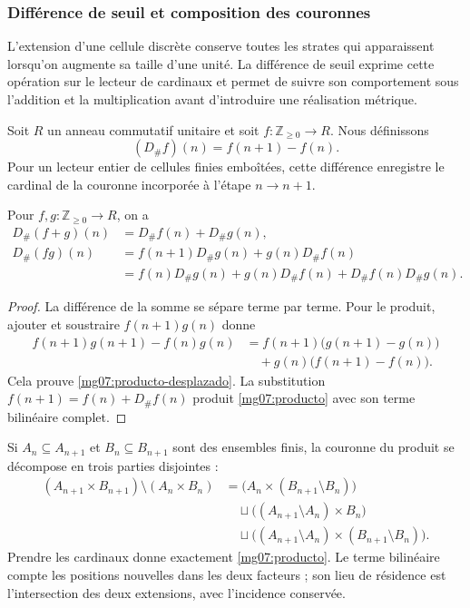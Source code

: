 \subsubsection{Différence de seuil et composition des couronnes}
\label{mg07:umbral}

L'extension d'une cellule discrète conserve toutes les strates qui
apparaissent lorsqu'on augmente sa taille d'une unité. La différence de seuil
exprime cette opération sur le lecteur de cardinaux et permet de suivre
son comportement sous l'addition et la multiplication avant d'introduire une
réalisation métrique.

\begin{definition}
Soit \(R\) un anneau commutatif unitaire et soit
\(f:\mathbb Z_{\geq0}\to R\). Nous définissons
\begin{equation}
 (D_\#f)(n)=f(n+1)-f(n).
 \label{mg07:definicion}
\end{equation}
Pour un lecteur entier de cellules finies emboîtées, cette différence
enregistre le cardinal de la couronne incorporée à l'étape \(n\to n+1\).
\end{definition}

\begin{proposition}
Pour \(f,g:\mathbb Z_{\geq0}\to R\), on a
\begin{align}
 D_\#(f+g)(n)&=D_\#f(n)+D_\#g(n),
 \label{mg07:aditividad}\\
 D_\#(fg)(n)&=f(n+1)D_\#g(n)+g(n)D_\#f(n)
 \label{mg07:producto-desplazado}\\
 &=f(n)D_\#g(n)+g(n)D_\#f(n)
   +D_\#f(n)D_\#g(n).
 \label{mg07:producto}
\end{align}
\end{proposition}

\begin{proof}
La différence de la somme se sépare terme par terme. Pour le produit,
ajouter et soustraire \(f(n+1)g(n)\) donne
\[
 \begin{split}
 f(n+1)g(n+1)-f(n)g(n)
 &=f(n+1)\bigl(g(n+1)-g(n)\bigr)\\
 &\quad+g(n)\bigl(f(n+1)-f(n)\bigr).
 \end{split}
\]
Cela prouve \eqref{mg07:producto-desplazado}. La substitution
\(f(n+1)=f(n)+D_\#f(n)\) produit
\eqref{mg07:producto} avec son terme bilinéaire complet.
\end{proof}

Si \(A_n\subseteq A_{n+1}\) et \(B_n\subseteq B_{n+1}\) sont des
ensembles finis, la couronne du produit se décompose en trois parties
disjointes :
\[
 \begin{split}
 (A_{n+1}\times B_{n+1})\setminus(A_n\times B_n)
 &=\bigl(A_n\times(B_{n+1}\setminus B_n)\bigr)\\
 &\quad\sqcup\bigl((A_{n+1}\setminus A_n)\times B_n\bigr)\\
 &\quad\sqcup\bigl((A_{n+1}\setminus A_n)
                 \times(B_{n+1}\setminus B_n)\bigr).
 \end{split}
\]
Prendre les cardinaux donne exactement \eqref{mg07:producto}. Le terme
bilinéaire compte les positions nouvelles dans les deux facteurs ; son lieu de résidence
est l'intersection des deux extensions, avec l'incidence conservée.


